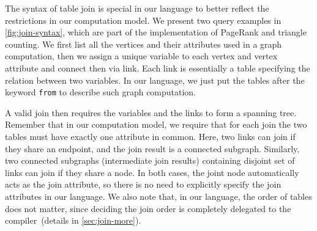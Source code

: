 \documentclass{sokendai_thesis} %
\begin{document}
The syntax of table join is special in our language to better reflect the restrictions in our computation model.
We present two query examples in \autoref{fig:join-syntax}, which are part of the implementation of PageRank and triangle counting.
We first list all the vertices and their attributes used in a graph computation, then we assign a unique variable to each vertex and vertex attribute and connect then via link.
Each link is essentially a table specifying the relation between two variables.
In our language, we just put the tables after the keyword \texttt{from} to describe such graph computation.

A valid join then requires the variables and the links to form a spanning tree.
Remember that in our computation model, we require that for each join the two tables must have exactly one attribute in common.
Here, two links can join if they share an endpoint, and the join result is a connected subgraph.
Similarly, two connected subgraphs (intermediate join results) containing disjoint set of links can join if they share a node.
In both cases, the joint node automatically acts as the join attribute, so there is no need to explicitly specify the join attributes in our language.
We also note that, in our language, the order of tables does not matter, since deciding the join order is completely delegated to the compiler~(details in \autoref{sec:join-more}).

\end{document}

